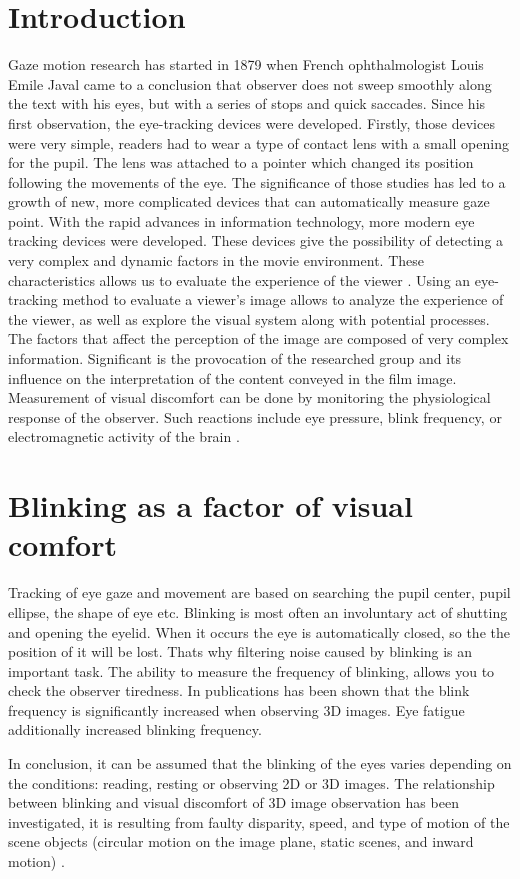 \documentclass[runningheads,a4paper]{llncs}
\begin{document}
\section{Introduction}\label{sec:intro}
Gaze motion research has started in 1879 when French ophthalmologist Louis Emile Javal came to a conclusion that observer does not sweep smoothly along the text with his eyes, but with a series of stops and quick saccades\cite{Winery}.  Since his first observation, the eye-tracking devices were developed. Firstly, those devices were very simple, readers had to wear a type of contact lens with a small opening for the pupil. The lens was attached to a pointer which changed its position following the movements of the eye. The significance of those studies has led to a growth of new, more complicated devices that can automatically measure gaze point. With the rapid advances in information technology, more modern eye tracking devices were developed. These devices give the possibility of detecting a very complex and dynamic factors in the movie environment. These characteristics allows us to evaluate the experience of the viewer \cite{mital2011clustering}.
Using an eye-tracking method to evaluate a viewer's image allows to analyze the experience of the viewer, as well as explore the visual system along with potential processes.
The factors that affect the perception of the image are composed of very complex information. Significant is the provocation of the researched group and its influence on the interpretation of the content conveyed in the film image. Measurement of visual discomfort can be done by monitoring the physiological response of the observer. Such reactions include eye pressure, blink frequency, or electromagnetic activity of the brain \cite{Fornalczyk_Napieralski_Szajerman_Wojciechowski_2015, Fornalczyk_Napieralski_Szajerman_Wojciechowski_20152}.



\section{Blinking as a factor of visual comfort}
Tracking of eye gaze and movement are based on searching the pupil center, pupil ellipse, the shape of eye etc. Blinking is most often an involuntary act of shutting and opening the eyelid. When it occurs the eye is automatically closed, so the the position of it will be lost. Thats why filtering noise caused by blinking is an important task. The ability to measure the frequency of blinking, allows you to check the observer tiredness. In publications \cite{5606312, 6211573} has been shown that the blink frequency is significantly increased when observing 3D images. Eye fatigue additionally increased blinking frequency. 
\par In conclusion, it can be assumed that the blinking of the eyes varies depending on the conditions: reading, resting or observing 2D or 3D images. The relationship between blinking and visual discomfort of 3D image observation has been investigated, it is resulting from faulty disparity, speed, and type of motion of the scene objects (circular motion on the image plane, static scenes, and inward motion) \cite{00789026}. 
\end{document}
